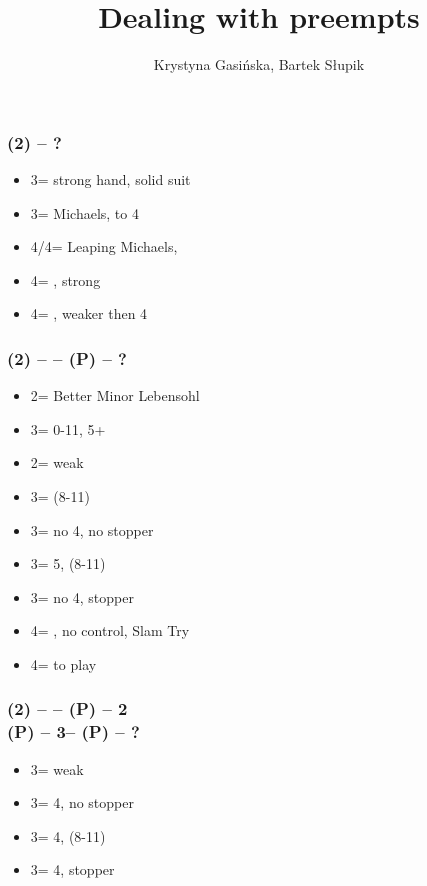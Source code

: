 \documentclass[12pt, a4paper]{article}
\title{Dealing with preempts}
\author{Krystyna Gasińska, Bartek Słupik}
\begin{document}
\maketitle


\subsubsection*{(2\hearts) -- ?}
\begin{itemize}
    \item 3\spades = strong hand, solid suit
    \item 3\hearts = Michaels, \ftwon to 4
    \item 4\clubs/4\diams = Leaping Michaels, \gf
    \item 4\hearts = \minor, strong
    \item 4\nt = \minor, weaker then 4\hearts
\end{itemize}

\subsubsection*{(2\hearts) -- \dbl -- (P) -- ?}
\begin{itemize}
    \item 2\nt = Better Minor Lebensohl
    \item 3\clubs = 0-11, 5+\clubs
    \item 2\spades = weak
    \item 3\diams = \inv (8-11)
    \item 3\hearts = no 4\spades, no \hearts stopper
    \item 3\spades = 5\spades, \inv (8-11) \imp
    \item 3\nt = no 4\spades, \hearts stopper
    \item 4\hearts = \minor, no \hearts control, Slam Try
    \item 4\spades = to play
\end{itemize}

\subsubsection*{(2\hearts) -- \dbl -- (P) -- 2\nt \\
                (P) -- 3\mins -- (P) -- ?}
\begin{itemize}
    \item 3\diams = weak
    \item 3\hearts = 4\spades, no \hearts stopper
    \item 3\spades = 4\spades, \inv (8-11) \imp
    \item 3\nt = 4\spades, \hearts stopper
\end{itemize}
\end{document}
